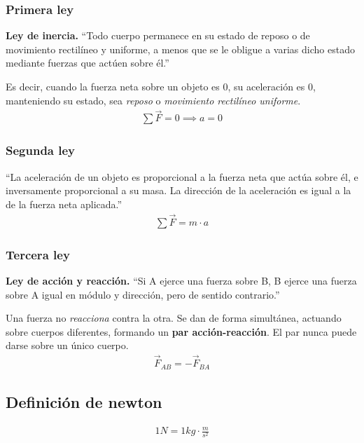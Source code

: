 \documentclass[12pt]{article}
\begin{document}
\subsubsection{Primera ley}

\textbf{Ley de inercia.}
``Todo cuerpo permanece en su estado de reposo o de movimiento rectilíneo
y uniforme, a menos que se le obligue a varias dicho estado mediante
fuerzas que actúen sobre él.''

Es decir,
cuando la fuerza neta sobre un objeto es 0,
su aceleración es 0,
manteniendo su estado,
sea \textit{reposo} o \textit{movimiento rectilíneo uniforme}.
\begin{align*}
  \sum\vec{F} = 0 \implies a=0
\end{align*}

\subsubsection{Segunda ley}

``La aceleración de un objeto es proporcional a la fuerza neta que actúa sobre
él,
e inversamente proporcional a su masa.
La dirección de la aceleración es igual a la de la fuerza neta aplicada.''
\begin{align*}
  \sum\vec{F}=m\cdot a
\end{align*}

\subsubsection{Tercera ley}

\textbf{Ley de acción y reacción.}
``Si A ejerce una fuerza sobre B, B ejerce una fuerza sobre A igual en
módulo y dirección, pero de sentido contrario.''

Una fuerza no \textit{reacciona} contra la otra. Se dan de forma simultánea,
actuando sobre cuerpos diferentes, formando un \textbf{par acción-reacción}.
El par nunca puede darse sobre un único cuerpo.
\begin{align*}
  \vec{F}_{AB} = -\vec{F}_{BA}
\end{align*}

\subsection{Definición de newton}

\begin{align*}
  1N=1kg\cdot \frac{m}{s^{2}}
\end{align*}
\end{document}
